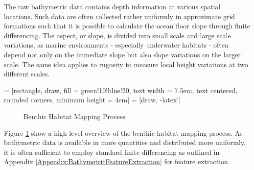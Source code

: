 		The raw bathymetric data contains depth information at various spatial locations. Such data are often collected rather uniformly in approximate grid formations such that it is possible to calculate the ocean floor slope through finite differencing. The aspect, or slope, is divided into small scale and large scale variations, as marine environments - especially underwater habitats - often depend not only on the immediate slope but also slope variations on the larger scale. The same idea applies to rugosity to measure local height variations at two different scales.
		
		 = [rectangle, draw, fill = green!10!blue!20, text width = 7.5em, text centered, rounded corners, minimum height = 4em]
		 = [draw, -latex']
	
		\begin{figure}[!ht]
		\centering{}		
		\caption{Benthic Habitat Mapping Process}
		\label{Figure:BenthicHabitatMappingProcess}
		\end{figure}
		
		Figure \ref{Figure:BenthicHabitatMappingProcess} show a high level overview of the benthic habitat mapping process. As bathymetric data is available in more quantities and distributed more uniformly, it is often sufficient to employ standard finite differencing as outlined in Appendix \ref{Appendix:BathymetricFeatureExtraction} for feature extraction. 
		
